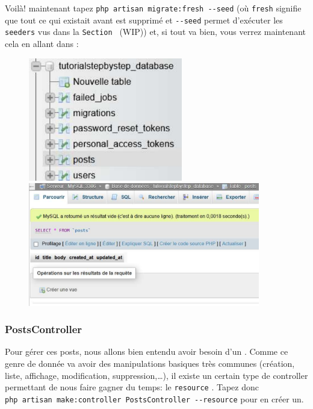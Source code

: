 Voilà! maintenant tapez \verb|php artisan migrate:fresh --seed| (où \verb|fresh| signifie que tout ce qui existait avant est supprimé et \verb|--seed| permet d'exécuter les \texttt{seeders} vus dans la \texttt{Section~} (WIP)) et, si tout va bien, vous verrez maintenant cela en allant dans \phpmyadmin{}:

\begin{figure}[!h]
    \centering
    \begin{minipage}{0.49\textwidth}
         \centering
         \includegraphics[width=0.6\textwidth]{figures-C1/db_posts_1.pdf}
    \end{minipage}
    \begin{minipage}{0.49\textwidth}
         \centering
         \includegraphics[width=0.9\textwidth]{figures-C1/db_posts_2.pdf}
    \end{minipage}
\end{figure}

\subsubsection[PostsController][laravel.com/docs/10.x/controllers\#resource-controllers]{PostsController}

Pour gérer ces posts, nous allons bien entendu avoir besoin d'un \controller{}. Comme ce genre de donnée va avoir des manipulations basiques très communes (création, liste, affichage, modification, suppression,\ldots), il existe un certain type de controller permettant de nous faire gagner du temps: le \texttt{resource} \controller{}. Tapez donc \\
\verb|php artisan make:controller PostsController --resource| pour en créer un.

